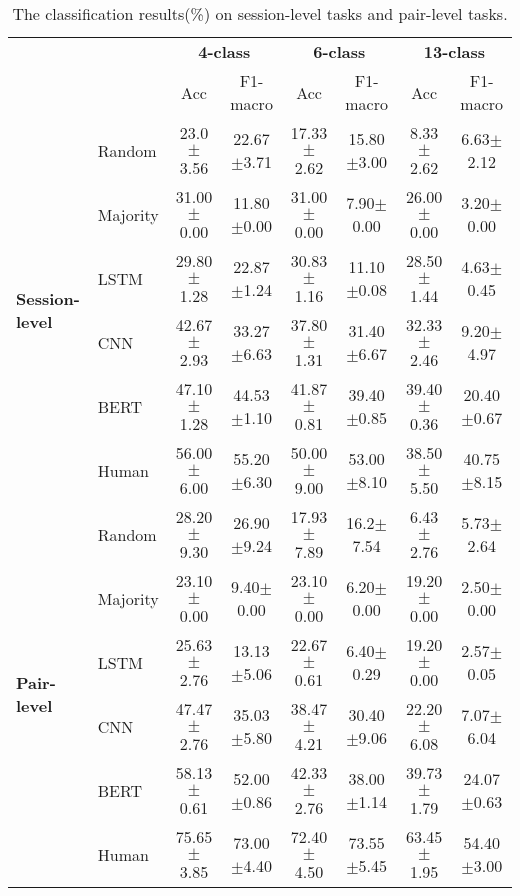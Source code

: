 \begin{table*}[th]
	\centering
	\small
	\begin{tabular}{@{}llcccccc@{}}
		\toprule[1.5pt]
		&               				& \multicolumn{2}{c}{\textbf{4-class}} & \multicolumn{2}{c}{\textbf{6-class}} & \multicolumn{2}{c}{\textbf{13-class}} \\ 
		& & Acc & F1-macro                 & Acc & F1-macro                  & Acc & F1-macro \\
		\midrule
		\multirow{6}{*}{\textbf{Session-level}}&Random   &23.0$\pm$3.56 &22.67$\pm$3.71 &17.33$\pm$2.62 & 15.80$\pm$3.00& 8.33$\pm$2.62& 6.63$\pm$2.12  \\		
		&Majority    &31.00$\pm$0.00 &11.80$\pm$0.00 &31.00$\pm$0.00 &7.90$\pm$0.00 &26.00$\pm$0.00 &3.20$\pm$0.00 \\
		&LSTM    &29.80$\pm$1.28 &22.87$\pm$1.24 &30.83$\pm$1.16 &11.10$\pm$0.08 &28.50$\pm$1.44 &4.63$\pm$0.45 \\
		&CNN    &42.67$\pm$2.93 & 33.27$\pm$6.63&37.80$\pm$1.31 & 31.40$\pm$6.67 &32.33$\pm$2.46 &9.20$\pm$4.97 \\
		&BERT   &47.10$\pm$1.28 &44.53$\pm$1.10 &41.87$\pm$0.81 &39.40$\pm$0.85 &39.40$\pm$0.36 &20.40$\pm$0.67 \\
		&Human &56.00$\pm$6.00 &55.20$\pm$6.30&50.00$\pm$9.00&53.00$\pm$8.10&38.50$\pm$5.50&40.75$\pm$8.15 \\ 
		\midrule
		\multirow{6}{*}{\textbf{Pair-level}}&Random   &28.20$\pm$9.30 &26.90$\pm$9.24 &17.93$\pm$7.89 &16.2$\pm$7.54 &6.43$\pm$2.76 & 5.73$\pm$2.64 \\		
		&Majority    &23.10$\pm$0.00 &9.40$\pm$0.00 &23.10$\pm$0.00 &6.20$\pm$0.00 &19.20$\pm$0.00 & 2.50$\pm$0.00\\
		&LSTM    &25.63$\pm$2.76 &13.13$\pm$5.06 &22.67$\pm$0.61 &6.40$\pm$0.29 &19.20$\pm$0.00 &2.57$\pm$0.05 \\	
		&CNN    &47.47$\pm$2.76 &35.03$\pm$5.80 &38.47$\pm$4.21 &30.40$\pm$9.06 & 22.20$\pm$6.08& 7.07$\pm$6.04\\	
		&BERT   &58.13$\pm$0.61 &52.00$\pm$0.86 & 42.33$\pm$2.76&38.00$\pm$1.14 &39.73$\pm$1.79 &24.07$\pm$0.63 \\
		&Human & 75.65$\pm$3.85 &73.00$\pm$4.40 & 72.40$\pm$4.50&73.55$\pm$5.45 &63.45$\pm$1.95 &54.40$\pm$3.00 \\ 
		\bottomrule[1.5pt]
		
	\end{tabular}
	\caption{The classification results(\%) on session-level tasks and pair-level tasks.}
	\label{tab:results}
\end{table*}


